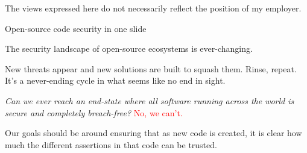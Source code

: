 \begin{frame}
\maketitle
\tiny\hspace{1em}The views expressed here do not necessarily reflect the position of my employer.
\end{frame}


\begin{frame}[fragile]{Open-source code security in one slide}
  \begin{wideitemize}
    \item The security landscape of open-source ecosystems is ever-changing.
    \item New threats appear and new solutions are built to squash them. Rinse, repeat.
    {\small It's a never-ending cycle in what seems like no end in sight.}
    \begin{wideitemize}
      \item \textit{Can we ever reach an end-state where all software
      running across the world is \textit{secure} and completely breach-free?}
      {\footnotesize\Handwritten\textcolor{Red}{No, we can't.}}
    \end{wideitemize}
    \item Our goals should be around ensuring that as new code is created, it is clear
    how much the different assertions in that code can be trusted.
  \end{wideitemize}
\end{frame}

